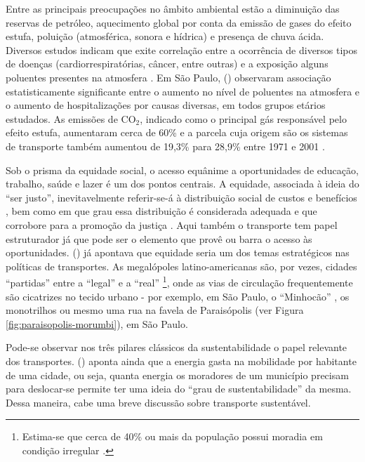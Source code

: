 Entre as principais preocupações no âmbito ambiental estão a diminuição das reservas de petróleo, aquecimento global por conta da emissão de gases do efeito estufa, poluição (atmosférica, sonora e hídrica) e presença de chuva ácida. Diversos estudos indicam que exite correlação entre a ocorrência de diversos tipos de doenças (cardiorrespiratórias, câncer, entre outras) e a exposição alguns poluentes presentes na atmosfera \cite{WHO2000,WHO2006,BRUNEKREEF2012,MIRANDA2012}. Em São Paulo,  (\citeyear{GOUVEIA2006}) observaram associação estatisticamente significante entre o aumento no nível de poluentes na atmosfera e o aumento de hospitalizações por causas diversas, em todos grupos etários estudados. As emissões de CO$_2$, indicado como o principal gás responsável pelo efeito estufa, aumentaram cerca de 60\% e a parcela cuja origem são os sistemas de transporte também aumentou de 19,3\% para 28,9\% entre 1971 e 2001 \cite{BANISTER2005}.

Sob o prisma da equidade social, o acesso equânime a oportunidades de educação, trabalho, saúde e lazer é um dos pontos centrais. A equidade, associada à ideia do ``ser justo'', inevitavelmente referir-se-á à distribuição social de custos e benefícios , bem como em que grau essa distribuição é considerada adequada e que corrobore para a promoção da justiça \cite{LITMAN2006}. Aqui também o transporte tem papel estruturador já que pode ser o elemento que provê ou barra o acesso às oportunidades.  (\citeyear{SANCHEZ2003}) já apontava que equidade seria um dos temas estratégicos nas políticas de transportes. As megalópoles latino-americanas são, por vezes, cidades ``partidas'' \cite{VENTURA2001} entre a ``legal'' e a ``real'' \cite{ALVA1997}
\footnote{Estima-se que cerca de 40\% ou mais da população possui moradia em condição irregular \cite{FREITAG2007}.},
onde as vias de circulação frequentemente são cicatrizes no tecido urbano - por exemplo, em São Paulo, o ``Minhocão'' \cite{ABASCAL2010}, os monotrilhos \cite{ROLNIK2010} ou mesmo uma rua na favela de Paraisópolis (ver Figura \ref{fig:paraisopolis-morumbi}), em São Paulo.

Pode-se observar nos três pilares clássicos da sustentabilidade o papel relevante dos transportes.  (\citeyear{VASCONCELLOS2012}) aponta ainda que a energia gasta na mobilidade por habitante de uma cidade, ou seja, quanta energia os moradores de um município precisam para deslocar-se permite ter uma ideia do ``grau de sustentabilidade'' da mesma. Dessa maneira, cabe uma breve discussão sobre transporte sustentável.

